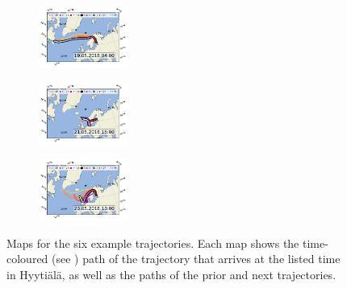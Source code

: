 \begin{figure}[H]
    \begin{subfigure}
        \centering
        \includegraphics[width=0.32\textwidth,valign=t]{sosaa-data/figures/trajectories/trajectory-19.05.2018:04.00.pdf}
    \end{subfigure}
    \begin{subfigure}
        \centering
        \includegraphics[width=0.32\textwidth,valign=t]{sosaa-data/figures/trajectories/trajectory-21.05.2018:15.00.pdf}
    \end{subfigure}
    \begin{subfigure}
        \centering
        \includegraphics[width=0.32\textwidth,valign=t]{sosaa-data/figures/trajectories/trajectory-23.05.2018:13.00.pdf}
    \end{subfigure}

    \caption[Maps for the six example trajectories]{Maps for the six example trajectories. Each map shows the time-coloured (see ) path of the trajectory that arrives at the listed time in Hyyti\"al\"a, as well as the paths of the prior and next trajectories.}
    \label{fig:six-trajectories-maps-v2}
\end{figure}

